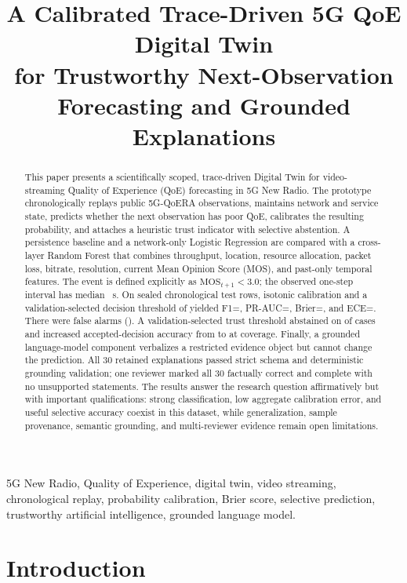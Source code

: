 \documentclass[10pt,conference]{IEEEtran}
\title{A Calibrated Trace-Driven 5G QoE Digital Twin\\
for Trustworthy Next-Observation Forecasting and Grounded Explanations}
\author{
\IEEEauthorblockN{Mohamed Oussama Bouriga and Ahmed Aziz Ben Aissa}
\IEEEauthorblockA{PGE 5 -- Artificial Intelligence and Data Science\\
Aivancity School for Technology, Business \& Society, Cachan, France}
}
\newcommand{\mos}{\mathrm{MOS}}
\begin{document}
\maketitle

\begin{abstract}
This paper presents a scientifically scoped, trace-driven Digital
Twin for video-streaming Quality of Experience (QoE) forecasting in 5G New
Radio.  The prototype chronologically replays public 5G-QoERA observations,
maintains network and service state, predicts whether the next observation has
poor QoE, calibrates the resulting probability, and attaches a heuristic trust
indicator with selective abstention.  A persistence baseline and a
network-only Logistic Regression are compared with a cross-layer Random
Forest that combines throughput, location, resource allocation, packet loss,
bitrate, resolution, current Mean Opinion Score (MOS), and past-only temporal
features.  The event is defined explicitly as
$\mos_{t+1}<3.0$; the observed one-step interval has median
\MedianLead~s.  On \TestRows sealed chronological test rows, isotonic
calibration and a validation-selected decision threshold of
\DecisionThreshold yielded F1=\RFFone, PR-AUC=\RFPRAUC,
Brier=\RFBrier, and ECE=\RFECE.  There were \FalsePositives false alarms
(\FalseAlarmRate).  A validation-selected trust threshold abstained on
\AbstentionRate of cases and increased accepted-decision accuracy from
\RFAccuracy to \AcceptedAccuracy at \Coverage coverage.  Finally, a grounded
language-model component verbalizes a restricted evidence object but cannot
change the prediction.  All 30 retained explanations passed strict schema and
deterministic grounding validation; one reviewer marked all 30 factually
correct and complete with no unsupported statements.  The results answer the
research question affirmatively but with important qualifications: strong
classification, low aggregate calibration error, and useful selective
accuracy coexist in this dataset, while generalization, sample provenance,
semantic grounding, and multi-reviewer evidence remain open limitations.
\end{abstract}

\begin{IEEEkeywords}
5G New Radio, Quality of Experience, digital twin, video streaming,
chronological replay, probability calibration, Brier score, selective
prediction, trustworthy artificial intelligence, grounded language model.
\end{IEEEkeywords}

\section{Introduction}
\end{document}
